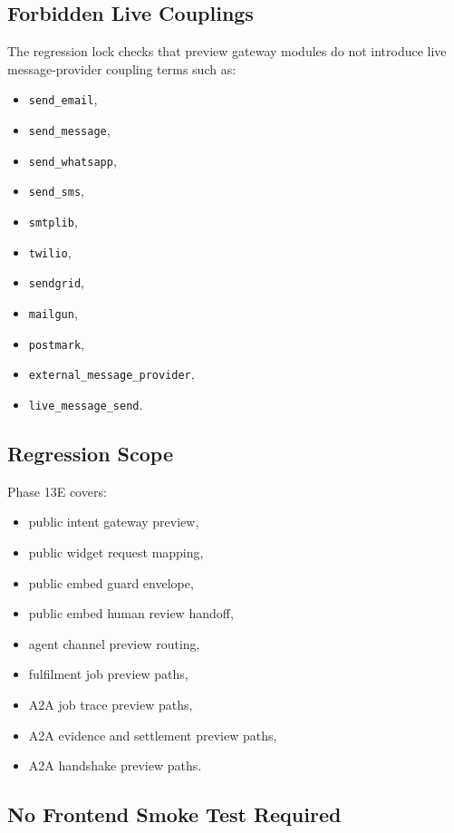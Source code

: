 \subsection{Forbidden Live Couplings}

The regression lock checks that preview gateway modules do not introduce live
message-provider coupling terms such as:

\begin{itemize}
  \item \texttt{send\_email},
  \item \texttt{send\_message},
  \item \texttt{send\_whatsapp},
  \item \texttt{send\_sms},
  \item \texttt{smtplib},
  \item \texttt{twilio},
  \item \texttt{sendgrid},
  \item \texttt{mailgun},
  \item \texttt{postmark},
  \item \texttt{external\_message\_provider},
  \item \texttt{live\_message\_send}.
\end{itemize}

\subsection{Regression Scope}

Phase 13E covers:

\begin{itemize}
  \item public intent gateway preview,
  \item public widget request mapping,
  \item public embed guard envelope,
  \item public embed human review handoff,
  \item agent channel preview routing,
  \item fulfilment job preview paths,
  \item A2A job trace preview paths,
  \item A2A evidence and settlement preview paths,
  \item A2A handshake preview paths.
\end{itemize}

\subsection{No Frontend Smoke Test Required}

